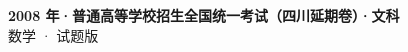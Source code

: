 \documentclass[zihao=-4, a4paper]{ctexart}
\begin{document}
\begin{center}
  {\Large\bfseries 2008 年·普通高等学校招生全国统一考试（四川延期卷）·文科}\\[4pt]
  {\large 数学 · 试题版}
\end{center}
\medskip
{}

\end{document}
